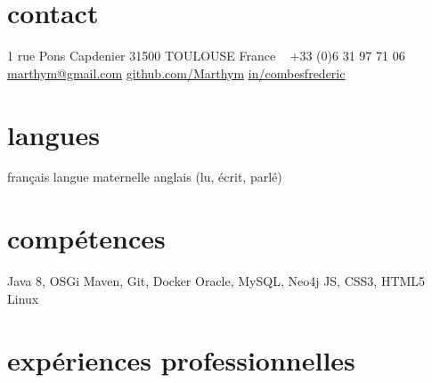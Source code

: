 \documentclass{friggeri-cv} 	%
\begin{document}


\begin{aside} %
\section{contact}
1 rue Pons Capdenier
31500 TOULOUSE
France
~
+33 (0)6 31 97 71 06
\href{mailto:marthym@gmail.com}{marthym@gmail.com}
\href{https://github.com/Marthym}{github.com/Marthym}
\href{https://www.linkedin.com/in/combesfrederic}{in/combesfrederic}
\section{langues}
français langue maternelle
anglais (lu, écrit, parlé)
\section{compétences}
Java 8, OSGi
Maven, Git, Docker
Oracle, MySQL, Neo4j
JS, CSS3, HTML5
Linux
\end{aside}

\section{expériences professionnelles}
\end{document}
